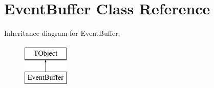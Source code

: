\hypertarget{class_event_buffer}{\section{Event\-Buffer Class Reference}
\label{class_event_buffer}
}
Inheritance diagram for Event\-Buffer\-:\begin{figure}[H]
\begin{center}
\leavevmode
\includegraphics[height=2.000000cm]{class_event_buffer}
\end{center}
\end{figure}
